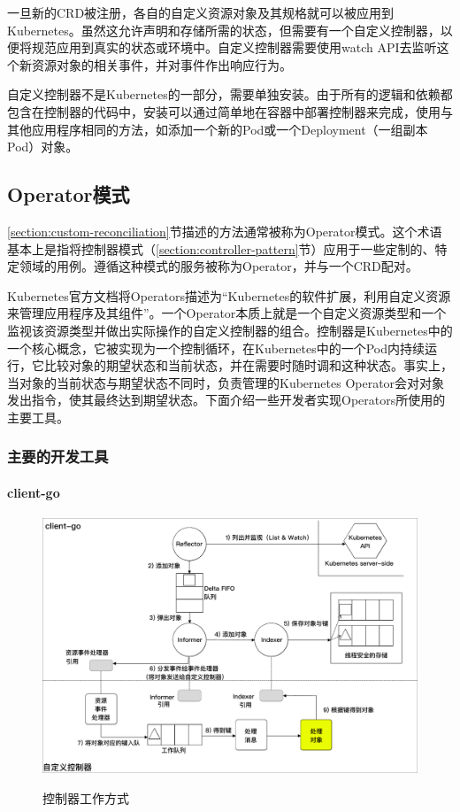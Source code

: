 \documentclass[macfonts,master]{njuthesis}
\begin{document}
一旦新的CRD被注册，各自的自定义资源对象及其规格就可以被应用到Kubernetes。虽然这允许声明和存储所需的状态，但需要有一个自定义控制器，以便将规范应用到真实的状态或环境中。自定义控制器需要使用watch API去监听这个新资源对象的相关事件，并对事件作出响应行为。

自定义控制器不是Kubernetes的一部分，需要单独安装。由于所有的逻辑和依赖都包含在控制器的代码中，安装可以通过简单地在容器中部署控制器来完成，使用与其他应用程序相同的方法，如添加一个新的Pod或一个Deployment（一组副本Pod）对象。

\subsection{Operator模式}

\ref{section:custom-reconciliation}节描述的方法通常被称为Operator模式。这个术语基本上是指将控制器模式（\ref{section:controller-pattern}节）应用于一些定制的、特定领域的用例。遵循这种模式的服务被称为Operator，并与一个CRD配对。

Kubernetes官方文档将Operators描述为``Kubernetes的软件扩展，利用自定义资源来管理应用程序及其组件''\cite{k8soperator}。一个Operator本质上就是一个自定义资源类型和一个监视该资源类型并做出实际操作的自定义控制器的组合。控制器是Kubernetes中的一个核心概念，它被实现为一个控制循环，在Kubernetes中的一个Pod内持续运行，它比较对象的期望状态和当前状态，并在需要时随时调和这种状态。事实上，当对象的当前状态与期望状态不同时，负责管理的Kubernetes Operator会对对象发出指令，使其最终达到期望状态。下面介绍一些开发者实现Operators所使用的主要工具。

\subsubsection{主要的开发工具}\label{section:wayofimplement}

\paragraph{client-go}


\begin{figure}[htbp]
  \centering
  \includegraphics[width= 1\textwidth]{pics/client-go-controller-interaction.pdf}\\
  \caption{控制器工作方式}\label{fig:client-go-controller-interaction}
\end{figure}
\end{document}
